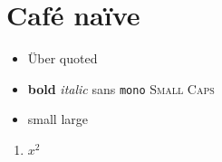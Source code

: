 \documentclass[12pt]{article}
\begin{document}
\section{Caf\'e na\"ive \textbullet}
\begin{itemize}
  \item \"Uber \textbullet{} \texteuro{} \guillemotleft{}quoted\guillemotright{}
  \item \textbf{bold} \textit{italic} \textsf{sans} \texttt{mono} \textsc{Small Caps}
  \item {\footnotesize small \textbullet} {\LARGE large \textbullet}
\end{itemize}
\begin{enumerate}
  \item $x^2$
\end{enumerate}
\end{document}

